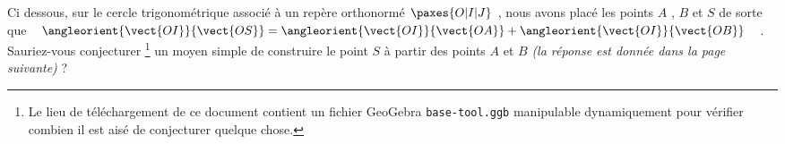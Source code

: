Ci dessous, sur le cercle trigonométrique associé à un repère orthonormé $\paxes{O | I | J}$ , nous avons placé les points $A$ , $B$ et $S$ de sorte que $\angleorient{\vect{OI}}{\vect{OS}} = \angleorient{\vect{OI}}{\vect{OA}} + \angleorient{\vect{OI}}{\vect{OB}}$ .
Sauriez-vous conjecturer
\footnote{
	Le lieu de téléchargement de ce document contient un fichier GeoGebra \texttt{base-tool.ggb} manipulable dynamiquement pour vérifier combien il est aisé de conjecturer quelque chose.
}
un moyen simple de construire le point $S$ à partir des points $A$ et $B$ \emph{(la réponse est donnée dans la page suivante)} ?


\medskip

\begin{multicols}{2}
	\center


	\columnbreak


\end{multicols}

